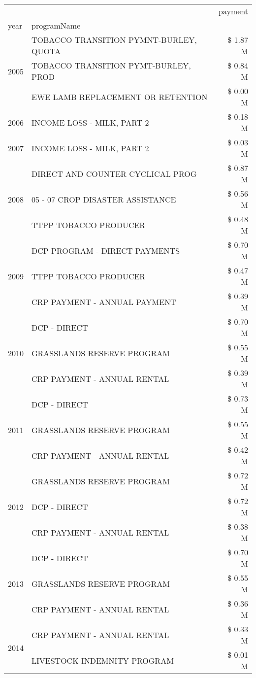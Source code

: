 \begin{tabular}{llr}
\toprule
 &  & payment \\
year & programName &  \\
\midrule
\multirow[t]{3}{*}{2005} & TOBACCO TRANSITION PYMNT-BURLEY, QUOTA & \$ 1.87 M \\
 & TOBACCO TRANSITION PYMT-BURLEY, PROD & \$ 0.84 M \\
 & EWE LAMB REPLACEMENT OR RETENTION & \$ 0.00 M \\
\cline{1-3}
2006 & INCOME LOSS - MILK, PART 2 & \$ 0.18 M \\
\cline{1-3}
2007 & INCOME LOSS - MILK, PART 2 & \$ 0.03 M \\
\cline{1-3}
\multirow[t]{3}{*}{2008} & DIRECT AND COUNTER CYCLICAL PROG & \$ 0.87 M \\
 & 05 - 07 CROP DISASTER ASSISTANCE & \$ 0.56 M \\
 & TTPP TOBACCO PRODUCER & \$ 0.48 M \\
\cline{1-3}
\multirow[t]{3}{*}{2009} & DCP PROGRAM - DIRECT PAYMENTS & \$ 0.70 M \\
 & TTPP TOBACCO PRODUCER & \$ 0.47 M \\
 & CRP PAYMENT - ANNUAL PAYMENT & \$ 0.39 M \\
\cline{1-3}
\multirow[t]{3}{*}{2010} & DCP - DIRECT & \$ 0.70 M \\
 & GRASSLANDS RESERVE PROGRAM & \$ 0.55 M \\
 & CRP PAYMENT - ANNUAL RENTAL & \$ 0.39 M \\
\cline{1-3}
\multirow[t]{3}{*}{2011} & DCP - DIRECT & \$ 0.73 M \\
 & GRASSLANDS RESERVE PROGRAM & \$ 0.55 M \\
 & CRP PAYMENT - ANNUAL RENTAL & \$ 0.42 M \\
\cline{1-3}
\multirow[t]{3}{*}{2012} & GRASSLANDS RESERVE PROGRAM & \$ 0.72 M \\
 & DCP - DIRECT & \$ 0.72 M \\
 & CRP PAYMENT - ANNUAL RENTAL & \$ 0.38 M \\
\cline{1-3}
\multirow[t]{3}{*}{2013} & DCP - DIRECT & \$ 0.70 M \\
 & GRASSLANDS RESERVE PROGRAM & \$ 0.55 M \\
 & CRP PAYMENT - ANNUAL RENTAL & \$ 0.36 M \\
\cline{1-3}
\multirow[t]{3}{*}{2014} & CRP PAYMENT - ANNUAL RENTAL & \$ 0.33 M \\
 & LIVESTOCK INDEMNITY PROGRAM & \$ 0.01 M \\

\end{tabular}
